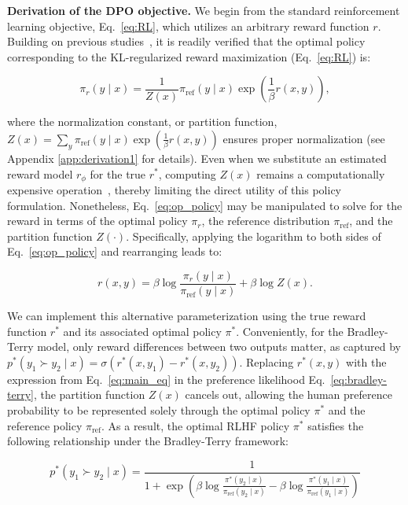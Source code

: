 \textbf{Derivation of the DPO objective.} We begin from the standard reinforcement learning objective, Eq.~\ref{eq:RL}, which utilizes an arbitrary reward function $r$. Building on previous studies~\citep{peters2007reinforcement, peng2019advantage, korbak2022reinforcement, go2023aligning}, it is readily verified that the optimal policy corresponding to the KL-regularized reward maximization (Eq.~\ref{eq:RL}) is:

\begin{equation}\label{eq:op_policy}
    \pi_r(y\mid x) = \frac{1}{Z(x)}\pi_\text{ref}(y\mid x)\exp\left(\frac{1}{\beta}r(x, y)\right),
\end{equation}

where the normalization constant, or partition function, $Z(x) =\sum_{y}\pi_\text{ref}(y\mid x)\exp\left(\frac{1}{\beta}r(x, y)\right)$ ensures proper normalization (see Appendix \ref{app:derivation1} for details). Even when we substitute an estimated reward model $r_{\phi}$ for the true $r^*$, computing $Z(x)$ remains a computationally expensive operation~\citep{korbak2022reinforcement, go2023aligning}, thereby limiting the direct utility of this policy formulation. Nonetheless, Eq.~\ref{eq:op_policy} may be manipulated to solve for the reward in terms of the optimal policy $\pi_r$, the reference distribution $\pi_\text{ref}$, and the partition function $Z(\cdot)$. Specifically, applying the logarithm to both sides of Eq.~\ref{eq:op_policy} and rearranging leads to:

\begin{equation}\label{eq:main_eq}
    r(x,y) =\beta \log \frac{\pi_r(y\mid x)}{\pi_\text{ref}(y\mid x)} + \beta \log Z(x).
\end{equation}

We can implement this alternative parameterization using the true reward function $r^*$ and its associated optimal policy $\pi^*$. Conveniently, for the Bradley-Terry model, only reward differences between two outputs matter, as captured by ${p^*(y_1 \succ y_2 \mid x) = \sigma(r^*(x, y_1) - r^*(x, y_2))}$. Replacing $r^*(x,y)$ with the expression from Eq.~\ref{eq:main_eq} in the preference likelihood Eq.~\ref{eq:bradley-terry}, the partition function $Z(x)$ cancels out, allowing the human preference probability to be represented solely through the optimal policy $\pi^*$ and the reference policy $\pi_\text{ref}$. As a result, the optimal RLHF policy $\pi^*$ satisfies the following relationship under the Bradley-Terry framework:

\begin{equation}\label{eq:objective}
    p^*(y_1\succ y_2 \mid x)=\frac{1}{1 + \exp\left(\beta \log \frac{\pi^*(y_2\mid x)}{\pi_\text{ref}(y_2\mid x)} - \beta \log \frac{\pi^*(y_1\mid x)}{\pi_\text{ref}(y_1\mid x)}\right)}
\end{equation}

